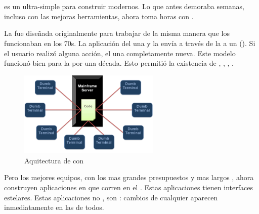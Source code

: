 \section{\meteorNAME}


\meteorNAME es un \environmentPL ultra-simple para construir \websitesINT modernos. Lo que antes demoraba semanas, incluso con las mejoras herramientas, ahora toma horas con \meteorNAME.

La \webINT fue diseñada originalmente para trabajar de la misma manera que los \mainframesAS funcionaban en los 70s. La aplicación del \serverAS \rendered una \screen y la envía a través de la \networkINT a un \dumbterminal (). Si el usuario realizó alguna acción, el \serverAS \rendered una \screen completamente nueva. Este modelo funcionó bien para la \webINT por una década. Esto permitió la existencia de \lampNAME, \railsNAME, \djangoNAME, \phpNAME.

\begin{figure}[h!]
	\centering
	\includegraphics[width=0.6\textwidth]{figuras/mainframeServer_dumbterminal.png}
	\caption{Aquitectura de \mainframeAS con \dumbterminal}
	\label{figure:mainframeServer_dumbterminal}
\end{figure}


Pero los mejores equipos, con los mas grandes presupuestos y mas largos \schedules, ahora construyen aplicaciones en \javaScriptNAME que corren en el \clientAS. Estas aplicaciones tienen interfaces estelares. Estas aplicaciones no \reload \pages, son \reactive: cambios de cualquier \clientAS aparecen inmediatamente en las \screen de todos.

